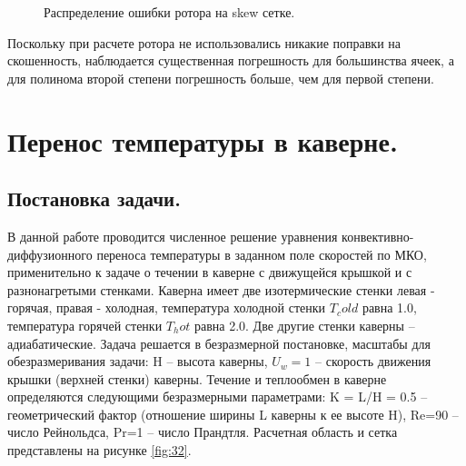 \begin{figure}[H]
    \centering
    \caption{Распределение ошибки ротора на skew сетке.}
    \label{fig:31}
\end{figure}

Поскольку при расчете ротора не использовались никакие поправки на скошенность,
наблюдается существенная погрешность для большинства ячеек, а для полинома второй
степени погрешность больше, чем для первой степени.


\section{Перенос температуры в каверне.}

\subsection{Постановка задачи.}
В данной работе проводится численное решение уравнения
конвективно-диффузионного переноса температуры в заданном поле
скоростей по МКО, применительно к задаче о течении в каверне с движущейся
крышкой и с разнонагретыми стенками.
Каверна имеет две изотермические стенки левая - горячая, правая - холодная, температура холодной стенки $T_cold$ равна 1.0, температура горячей стенки $T_hot$ равна 2.0. Две другие стенки каверны – адиабатические. Задача решается в безразмерной постановке, масштабы для обезразмеривания задачи: H – высота каверны, $U_w=1$ – скорость движения крышки (верхней стенки) каверны. Течение и теплообмен в каверне определяются следующими безразмерными параметрами: K = L/H = 0.5 – геометрический фактор (отношение ширины L каверны к ее высоте H), Re=90 – число Рейнольдса, Pr=1 – число Прандтля. Расчетная область и сетка представлены на рисунке \ref{fig:32}.

